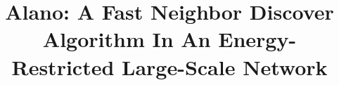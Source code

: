 \documentclass[conference]{IEEEtran}
\begin{document}
\title{Alano: A Fast Neighbor Discover Algorithm In An Energy-Restricted Large-Scale Network}


%

\maketitle



\IEEEpeerreviewmaketitle

















\end{document}
